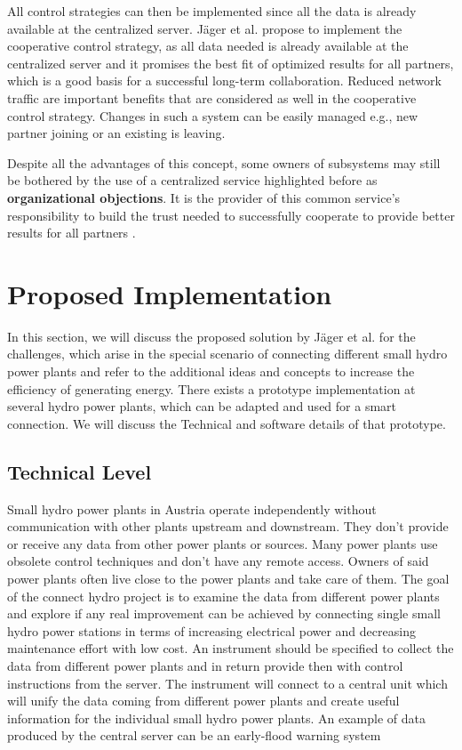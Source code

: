 All control strategies can then be implemented since all the data is already available at the centralized server. 
Jäger et al. \cite{SEIT2017} propose to implement the cooperative control strategy, as all data needed is already available at the centralized server and it promises the best fit of optimized results for all partners, which is a good basis for a successful long-term collaboration. Reduced network traffic are important benefits that are considered as well in the cooperative control strategy. Changes in such a system can be easily managed e.g., new partner joining or an existing is leaving. 

Despite all the advantages of this concept, some owners of subsystems may still be bothered by the use of a centralized service highlighted before as \textbf{organizational objections}. It is the provider of this common service's responsibility to build the trust needed to successfully cooperate to provide better results for all partners \cite{SEIT2017}.

\section{Proposed Implementation}
In this section, we will discuss the proposed solution by Jäger et al. \cite{SEIT2017} for the challenges, which arise in the special scenario of connecting different small hydro power plants and refer to the additional ideas and concepts to increase the efficiency of generating energy. There exists a prototype implementation at several hydro power plants, which can be adapted and used for a smart connection. We will discuss the Technical and software details of that prototype.
\subsection{Technical Level}
Small hydro power plants in Austria operate independently without communication with other plants upstream and downstream. They don't provide or receive any data from other power plants or sources. Many power plants use obsolete control techniques and don't have any remote access. Owners of said power plants often live close to the power plants and take care of them. The goal of the connect hydro project is to examine the data from different power plants and explore if any real improvement can be achieved by connecting single small hydro power stations in terms of increasing electrical power and decreasing maintenance effort with low cost. An instrument should be specified to collect the data from different power plants and in return provide then with control instructions from the server. The instrument will connect to a central unit which will unify the data coming from different power plants and create useful information for the individual small hydro power plants. An example of data produced by the central server can be an early-flood warning system

